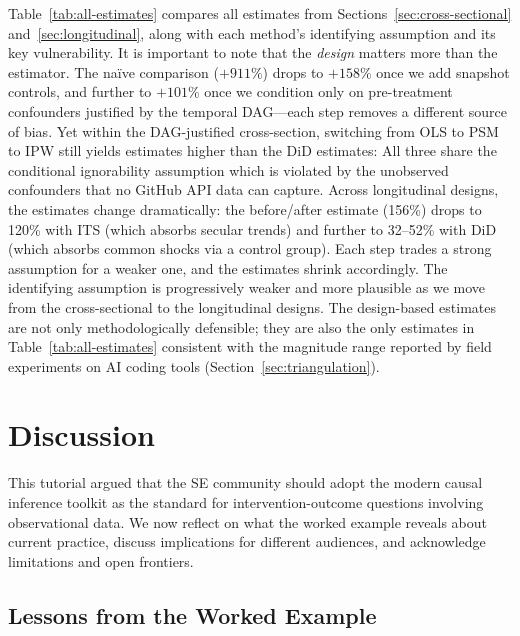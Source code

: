 Table~\ref{tab:all-estimates} compares all estimates from Sections~\ref{sec:cross-sectional} and~\ref{sec:longitudinal}, along with each method's identifying assumption and its key vulnerability.
It is important to note that the \emph{design} matters more than the estimator.
The na\"ive comparison ($+911\%$) drops to $+158\%$ once we add snapshot controls, and further to $+101\%$ once we condition only on pre-treatment confounders justified by the temporal DAG---each step removes a different source of bias.
Yet within the DAG-justified cross-section, switching from OLS to PSM to IPW still yields estimates higher than the DiD estimates: All three share the conditional ignorability assumption which is violated by the unobserved confounders that no GitHub API data can capture.
Across longitudinal designs, the estimates change dramatically: the before/after estimate (156\%) drops to 120\% with ITS (which absorbs secular trends) and further to 32--52\% with DiD (which absorbs common shocks via a control group).
Each step trades a strong assumption for a weaker one, and the estimates shrink accordingly.
The identifying assumption is progressively weaker and more plausible as we move from the cross-sectional to the longitudinal designs.
The design-based estimates are not only methodologically defensible; they are also the only estimates in Table~\ref{tab:all-estimates} consistent with the magnitude range reported by field experiments on AI coding tools (Section~\ref{sec:triangulation}).

\section{Discussion}
\label{sec:discussion}

This tutorial argued that the SE community should adopt the modern causal inference toolkit as the standard for intervention-outcome questions involving observational data.
We now reflect on what the worked example reveals about current practice, discuss implications for different audiences, and acknowledge limitations and open frontiers.

\subsection{Lessons from the Worked Example}

